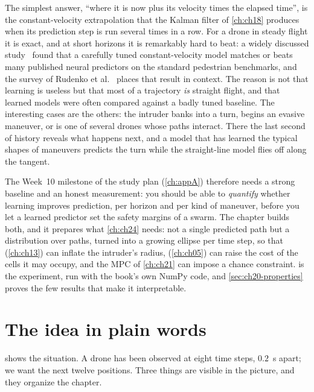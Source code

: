 The simplest answer, ``where it is now plus its velocity times the elapsed
time'', is the constant-velocity extrapolation that the Kalman filter of
\cref{ch:ch18} produces when its prediction step is run several times in a
row. For a drone in steady flight it is exact, and at short horizons it is
remarkably hard to beat: a widely discussed
study~\cite{schoeller2020constant} found that a carefully tuned
constant-velocity model matches or beats many published neural predictors on
the standard pedestrian benchmarks, and the survey of Rudenko et
al.~\cite{rudenko2020human} places that result in context. The reason is not
that learning is useless but that most of a trajectory \emph{is} straight
flight, and that learned models were often compared against a badly tuned
baseline. The interesting cases are the others: the intruder banks into a
turn, begins an evasive maneuver, or is one of several drones whose paths
interact. There the last second of history reveals what happens next, and a
model that has learned the typical shapes of maneuvers predicts the turn
while the straight-line model flies off along the tangent.

The Week~10 milestone of the study plan (\cref{ch:appA}) therefore needs a
strong baseline and an honest measurement: you should be able to
\emph{quantify} whether learning improves prediction, per horizon and per
kind of maneuver, before you let a learned predictor set the safety margins
of a swarm. The chapter builds both, and it prepares what \cref{ch:ch24}
needs: not a single predicted path but a distribution over paths, turned
into a growing ellipse per time step, so that \orca (\cref{ch:ch13}) can
inflate the intruder's radius, \dstarlite (\cref{ch:ch05}) can raise the
cost of the cells it may occupy, and the MPC of \cref{ch:ch21} can impose a
chance constraint.  is the experiment, run with the
book's own NumPy code, and \cref{sec:ch20-properties} proves the few results
that make it interpretable.

\section{The idea in plain words}
\label{sec:ch20-intuition}

 shows the situation. A drone has been observed at eight
time steps, $0.2$~s apart; we want the next twelve positions. Three things
are visible in the picture, and they organize the chapter.

